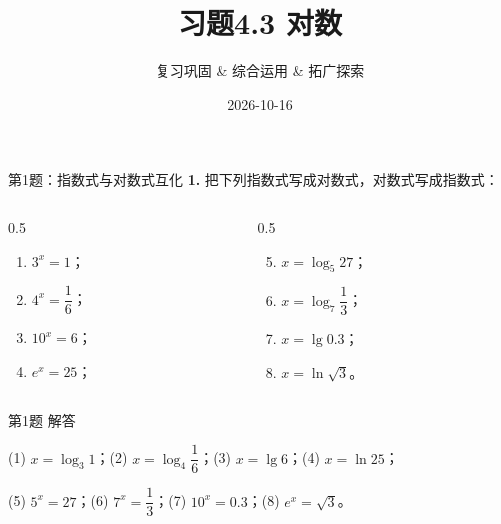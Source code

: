 \documentclass[10pt,aspectratio=169,serif]{beamer}
\title[习题4.3]{习题4.3 对数}
\subtitle{复习巩固 \& 综合运用 \& 拓广探索}
\author{}
\institute{}
\date{2026-10-16}
\begin{document}
\begin{frame}
  \titlepage
\end{frame}

\begin{frame}[t]{第1题：指数式与对数式互化}
\textbf{1.} 把下列指数式写成对数式，对数式写成指数式：

\vspace{0.3em}
\begin{columns}[t]
\begin{column}{0.5\textwidth}
\begin{enumerate}
  \item $3^x = 1$；
  \item $4^x = \dfrac{1}{6}$；
  \item $10^x = 6$；
  \item $e^x = 25$；
\end{enumerate}
\end{column}
\begin{column}{0.5\textwidth}
\begin{enumerate}\setcounter{enumi}{4}
  \item $x = \log_5 27$；
  \item $x = \log_7\dfrac{1}{3}$；
  \item $x = \lg 0.3$；
  \item $x = \ln\sqrt{3}$。
\end{enumerate}
\end{column}
\end{columns}
\end{frame}

\begin{frame}[t]{第1题 解答}
\begin{tcolorbox}[colback=orange!10,colframe=orange,title=\textbf{解}]
(1) $x = \log_3 1$；\quad (2) $x = \log_4\dfrac{1}{6}$；\quad (3) $x = \lg 6$；\quad (4) $x = \ln 25$；

(5) $5^x = 27$；\quad (6) $7^x = \dfrac{1}{3}$；\quad (7) $10^x = 0.3$；\quad (8) $e^x = \sqrt{3}$。
\end{tcolorbox}
\end{frame}
\end{document}
